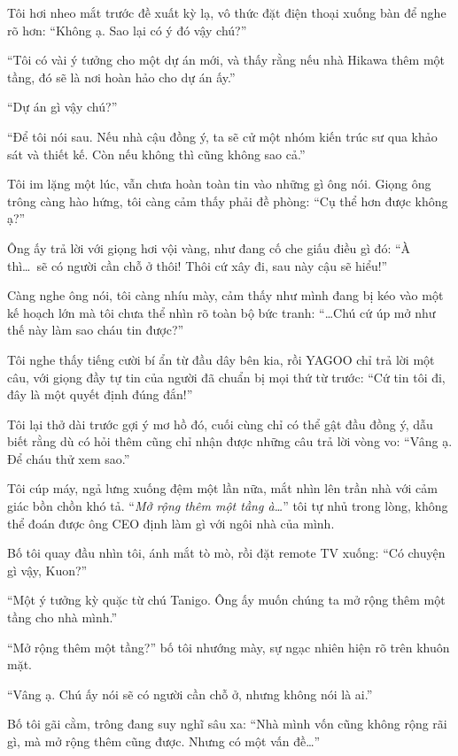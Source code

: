 \documentclass[../main.tex]{subfiles}
\begin{document}
Tôi hơi nheo mắt trước đề xuất kỳ lạ, vô thức đặt điện thoại xuống bàn để nghe rõ hơn: ``Không ạ. Sao lại có ý đó vậy chú?''

``Tôi có vài ý tưởng cho một dự án mới, và thấy rằng nếu nhà Hikawa thêm một tầng, đó sẽ là nơi hoàn hảo cho dự án ấy.''

``Dự án gì vậy chú?''

``Để tôi nói sau. Nếu nhà cậu đồng ý, ta sẽ cử một nhóm kiến trúc sư qua khảo sát và thiết kế. Còn nếu không thì cũng không sao cả.''

Tôi im lặng một lúc, vẫn chưa hoàn toàn tin vào những gì ông nói. Giọng ông trông càng hào hứng, tôi càng cảm thấy phải đề phòng: ``Cụ thể hơn được không ạ?''

Ông ấy trả lời với giọng hơi vội vàng, như đang cố che giấu điều gì đó: ``À thì\dots\ sẽ có người cần chỗ ở thôi! Thôi cứ xây đi, sau này cậu sẽ hiểu!''

Càng nghe ông nói, tôi càng nhíu mày, cảm thấy như mình đang bị kéo vào một kế hoạch lớn mà tôi chưa thể nhìn rõ toàn bộ bức tranh: ``\dots Chú cứ úp mở như thế này làm sao cháu tin được?''

Tôi nghe thấy tiếng cười bí ẩn từ đầu dây bên kia, rồi YAGOO chỉ trả lời một câu, với giọng đầy tự tin của người đã chuẩn bị mọi thứ từ trước: ``Cứ tin tôi đi, đây là một quyết định đúng đắn!''

Tôi lại thở dài trước gợi ý mơ hồ đó, cuối cùng chỉ có thể gật đầu đồng ý, dẫu biết rằng dù có hỏi thêm cũng chỉ nhận được những câu trả lời vòng vo: ``Vâng ạ. Để cháu thử xem sao.''

Tôi cúp máy, ngả lưng xuống đệm một lần nữa, mắt nhìn lên trần nhà với cảm giác bồn chồn khó tả. ``\textit{Mở rộng thêm một tầng à\dots}'' tôi tự nhủ trong lòng, không thể đoán được ông CEO định làm gì với ngôi nhà của mình.


Bố tôi quay đầu nhìn tôi, ánh mắt tò mò, rồi đặt remote TV xuống: ``Có chuyện gì vậy, Kuon?''

``Một ý tưởng kỳ quặc từ chú Tanigo. Ông ấy muốn chúng ta mở rộng thêm một tầng cho nhà mình.''

``Mở rộng thêm một tầng?'' bố tôi nhướng mày, sự ngạc nhiên hiện rõ trên khuôn mặt.

``Vâng ạ. Chú ấy nói sẽ có người cần chỗ ở, nhưng không nói là ai.''

Bố tôi gãi cằm, trông đang suy nghĩ sâu xa: ``Nhà mình vốn cũng không rộng rãi gì, mà mở rộng thêm cũng được. Nhưng có một vấn đề\dots''
\end{document}
